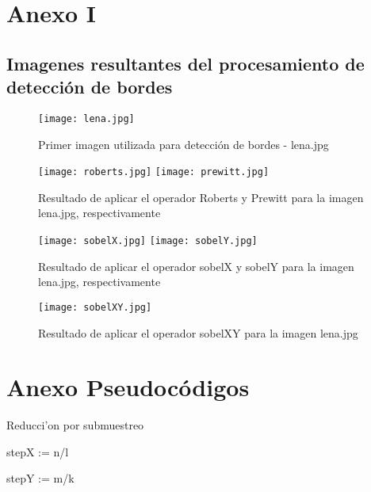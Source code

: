 \documentclass[11pt, a4paper]{article}
\begin{document}
\newpage
\section{Anexo I}
\subsection{Imagenes resultantes del procesamiento de detecci\'on de bordes}

\vspace{2cm}

\begin{figure}[ht] %
\centering
\texttt{[image: lena.jpg]}
\caption{Primer imagen utilizada para detecci\'on de bordes - lena.jpg}
\end{figure}

\vspace{3cm}

\begin{figure}[ht] %
\centering
\texttt{[image: roberts.jpg]}\hspace{1cm}
\texttt{[image: prewitt.jpg]}
\caption{Resultado de aplicar el operador Roberts y Prewitt para la imagen lena.jpg, respectivamente}
\end{figure}

\begin{figure}[ht] %
\centering
\texttt{[image: sobelX.jpg]}\hspace{1cm}
\texttt{[image: sobelY.jpg]}
\caption{Resultado de aplicar el operador sobelX y sobelY para la imagen lena.jpg, respectivamente}
\end{figure}
\vspace{5cm}
\begin{figure}[ht] %
\centering
\texttt{[image: sobelXY.jpg]}
\caption{Resultado de aplicar el operador sobelXY para la imagen lena.jpg}
\end{figure}


\newpage
\section{Anexo Pseudoc\'odigos}


    \incmargin{1em}
    \linesnumbered
    \dontprintsemicolon
    
	\begin{algorithm}[H]
    
	\caption{Reducci'on por submuestreo}
	\BlankLine
	
	stepX := n/l
	
	stepY := m/k 
	
			
	\end{algorithm}
	\decmargin{1em}
\end{document}
